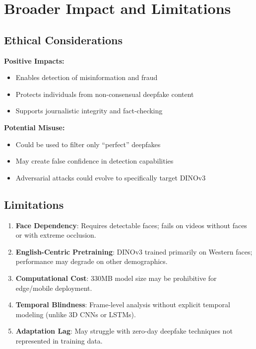 \documentclass[11pt,a4paper]{article}
\begin{document}
\section{Broader Impact and Limitations}

\subsection{Ethical Considerations}

\textbf{Positive Impacts:}
\begin{itemize}
    \item Enables detection of misinformation and fraud
    \item Protects individuals from non-consensual deepfake content
    \item Supports journalistic integrity and fact-checking
\end{itemize}

\textbf{Potential Misuse:}
\begin{itemize}
    \item Could be used to filter only ``perfect'' deepfakes
    \item May create false confidence in detection capabilities
    \item Adversarial attacks could evolve to specifically target DINOv3
\end{itemize}

\subsection{Limitations}

\begin{enumerate}
    \item \textbf{Face Dependency}: Requires detectable faces; fails on videos without faces or with extreme occlusion.
    
    \item \textbf{English-Centric Pretraining}: DINOv3 trained primarily on Western faces; performance may degrade on other demographics.
    
    \item \textbf{Computational Cost}: 330MB model size may be prohibitive for edge/mobile deployment.
    
    \item \textbf{Temporal Blindness}: Frame-level analysis without explicit temporal modeling (unlike 3D CNNs or LSTMs).
    
    \item \textbf{Adaptation Lag}: May struggle with zero-day deepfake techniques not represented in training data.
\end{enumerate}
\end{document}
